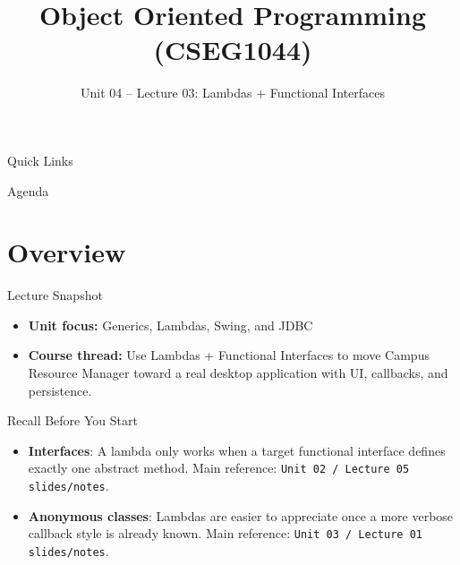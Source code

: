 \documentclass{beamer}
\title[OOPS with Java]{Object Oriented Programming (CSEG1044)}
\subtitle{Unit 04 -- Lecture 03: Lambdas + Functional Interfaces}
\begin{document}
\begin{frame}[fragile]
  \titlepage
  \vspace{0.5em}
  \slidesources{\OOPSUnitIVSources}
\end{frame}

\begin{frame}{Quick Links}
  \centering
  \hyperlink{sec:overview}{}\hspace{0.6em}
  \hyperlink{sec:concepts}{}\hspace{0.6em}
  \hyperlink{sec:demo}{}\hspace{0.6em}
  \hyperlink{sec:summary}{}
  \slidesources{\OOPSUnitIVSources}
\end{frame}

\begin{frame}{Agenda}
  \tableofcontents
  \slidesources{\OOPSUnitIVSources}
\end{frame}

\section{Overview}
\label{sec:overview}

\begin{frame}{Lecture Snapshot}
\begin{itemize}[<+->]
  \item \textbf{Unit focus:} Generics, Lambdas, Swing, and JDBC
  \item \textbf{Course thread:} Use Lambdas + Functional Interfaces to move Campus Resource Manager toward a real desktop application with UI, callbacks, and persistence.
\end{itemize}
  \slidesources{\OOPSUnitIVSources}
\end{frame}

\begin{frame}{Recall Before You Start}
\begin{itemize}[<+->]
  \item \textbf{Interfaces}: A lambda only works when a target functional interface defines exactly one abstract method. Main reference: \texttt{Unit 02 / Lecture 05 slides/notes}.
  \item \textbf{Anonymous classes}: Lambdas are easier to appreciate once a more verbose callback style is already known. Main reference: \texttt{Unit 03 / Lecture 01 slides/notes}.
\end{itemize}
  \slidesources{\OOPSUnitIVSources}
\end{frame}
\end{document}
